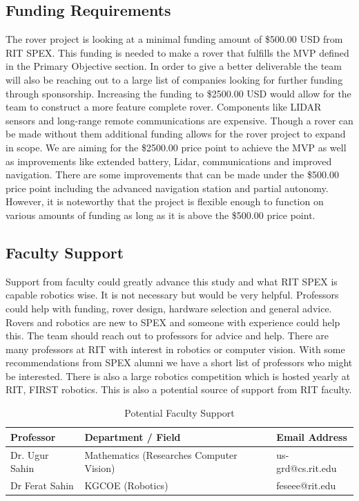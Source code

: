 \documentclass[conference]{IEEEtran} %
\begin{document}
\subsection{Funding Requirements}
\label{subsec:funding}
The rover project is looking at a minimal funding amount of \$500.00 USD from RIT SPEX. This funding is needed to make a rover that fulfills the MVP defined in the Primary Objective section. In order to give a better deliverable the team will also be reaching out to a large list of companies looking for further funding through sponsorship. 
Increasing the funding to \$2500.00 USD would allow for the team to construct a more feature complete rover. Components like LIDAR sensors and long-range remote communications are expensive. 
Though a rover can be made without them additional funding allows for the rover project to expand in scope. 
We are aiming for the \$2500.00 price point to achieve the MVP as well as improvements like extended battery, Lidar, communications and improved navigation. There are some improvements that can be made under the \$500.00 price point including the advanced navigation station and partial autonomy. 
However, it is noteworthy that the project is flexible enough to function on various amounts of funding as long as it is above the \$500.00 price point.

\subsection{Faculty Support}
\label{subsec:faculty}
Support from faculty could greatly advance this study and what RIT SPEX is capable robotics wise. 
It is not necessary but would be very helpful. 
Professors could help with funding, rover design, hardware selection and general advice. 
Rovers and robotics are new to SPEX and someone with experience could help this. 
The team should reach out to professors for advice and help. 
There are many professors at RIT with interest in robotics or computer vision. 
With some recommendations from SPEX alumni we have a short list of professors who might be interested. 
There is also a large robotics competition which is hosted yearly at RIT, FIRST robotics. 
This is also a potential source of support from RIT faculty. 

\begin{table}[ht!]
    \caption{Potential Faculty Support}
    \centering
    {\renewcommand{\arraystretch}{1.5}
    \begin{tabularx}{\linewidth}{LLL} 
    \hline
    \textbf{Professor} & \textbf{Department / Field} & \textbf{Email Address} \\
    \hline
    Dr. Ugur Sahin & Mathematics (Researches Computer Vision) & us-grd@cs.rit.edu \\
    Dr Ferat Sahin & KGCOE (Robotics) & feseee@rit.edu \\
    \hline
    \end{tabularx}
    }
\label{tab:fac-sup}
\end{table}
\end{document}

